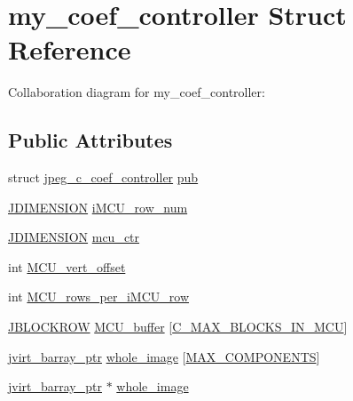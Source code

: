 \hypertarget{structmy__coef__controller}{}\section{my\+\_\+coef\+\_\+controller Struct Reference}
\label{structmy__coef__controller}


Collaboration diagram for my\+\_\+coef\+\_\+controller\+:
\subsection*{Public Attributes}
\begin{DoxyCompactItemize}
\item 
struct \hyperlink{structjpeg__c__coef__controller}{jpeg\+\_\+c\+\_\+coef\+\_\+controller} \hyperlink{structmy__coef__controller_a5585d883f38ce6d73d0d2fb31457f4e5}{pub}
\item 
\hyperlink{jmorecfg_8h_a04ed4674f6f1d0d50ec241531e38274f}{J\+D\+I\+M\+E\+N\+S\+I\+O\+N} \hyperlink{structmy__coef__controller_aebf2f540f71a3af44f75544ef474badb}{i\+M\+C\+U\+\_\+row\+\_\+num}
\item 
\hyperlink{jmorecfg_8h_a04ed4674f6f1d0d50ec241531e38274f}{J\+D\+I\+M\+E\+N\+S\+I\+O\+N} \hyperlink{structmy__coef__controller_adfe2cbcbfc3c4760874392d8488d88fd}{mcu\+\_\+ctr}
\item 
int \hyperlink{structmy__coef__controller_a47e8d96f30f813289b02267601c4a7b4}{M\+C\+U\+\_\+vert\+\_\+offset}
\item 
int \hyperlink{structmy__coef__controller_a11bc55a8487bfdd201d2ca756d132023}{M\+C\+U\+\_\+rows\+\_\+per\+\_\+i\+M\+C\+U\+\_\+row}
\item 
\hyperlink{jpeglib_8h_a04dea0959d9bd9e8ddad83597161453b}{J\+B\+L\+O\+C\+K\+R\+O\+W} \hyperlink{structmy__coef__controller_a9eac536791caff80d2c99c204237b0ee}{M\+C\+U\+\_\+buffer} \mbox{[}\hyperlink{jpeglib_8h_a4f270f4efb3fc0bb09f0d5ffa51ca327}{C\+\_\+\+M\+A\+X\+\_\+\+B\+L\+O\+C\+K\+S\+\_\+\+I\+N\+\_\+\+M\+C\+U}\mbox{]}
\item 
\hyperlink{jpeglib_8h_a994f4cba141d82ded90af38e51223f0b}{jvirt\+\_\+barray\+\_\+ptr} \hyperlink{structmy__coef__controller_aedc0b0cdda57a7f9e8c49770995b12b4}{whole\+\_\+image} \mbox{[}\hyperlink{jmorecfg_8h_a6d8c910a1fdb6d4762a05f7250e64322}{M\+A\+X\+\_\+\+C\+O\+M\+P\+O\+N\+E\+N\+T\+S}\mbox{]}
\item 
\hyperlink{jpeglib_8h_a994f4cba141d82ded90af38e51223f0b}{jvirt\+\_\+barray\+\_\+ptr} $\ast$ \hyperlink{structmy__coef__controller_a7e6db8186140ced6ed561b2860c84819}{whole\+\_\+image}

\end{DoxyCompactItemize}
